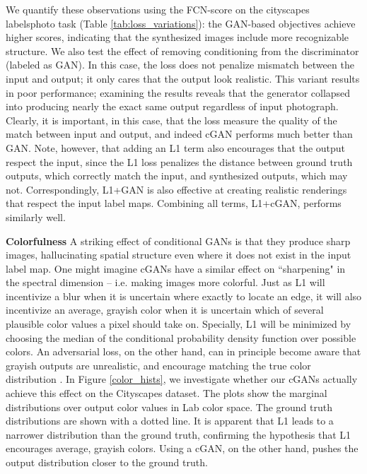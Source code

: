 \documentclass[10pt,twocolumn,letterpaper]{article}
\begin{document}
We quantify these observations using the FCN-score on the cityscapes labelsphoto task (Table \ref{tab:loss_variations}): the GAN-based objectives achieve higher scores, indicating that the synthesized images include more recognizable structure. We also test the effect of removing conditioning from the discriminator (labeled as GAN). In this case, the loss does not penalize mismatch between the input and output; it only cares that the output look realistic. This variant results in poor performance; examining the results reveals that the generator collapsed into producing nearly the exact same output regardless of input photograph. Clearly, it is important, in this case, that the loss measure the quality of the match between input and output, and indeed cGAN performs much better than GAN. Note, however, that adding an L1 term also encourages that the output respect the input, since the L1 loss penalizes the distance between ground truth outputs, which correctly match the input, and synthesized outputs, which may not. Correspondingly, L1+GAN is also effective at creating realistic renderings that respect the input label maps. Combining all terms, L1+cGAN, performs similarly well.



{\bf Colorfulness} A striking effect of conditional GANs is that they produce sharp images, hallucinating spatial structure even where it does not exist in the input label map. One might imagine cGANs have a similar effect on ``sharpening" in the spectral dimension -- i.e. making images more colorful. Just as L1 will incentivize a blur when it is uncertain where exactly to locate an edge, it will also incentivize an average, grayish color when it is uncertain which of several plausible color values a pixel should take on. Specially, L1 will be minimized by choosing the median of the conditional probability density function over possible colors. An adversarial loss, on the other hand, can in principle become aware that grayish outputs are unrealistic, and encourage matching the true color distribution \cite{goodfellow2014generative}. In Figure \ref{color_hists}, we investigate whether our cGANs actually achieve this effect on the Cityscapes dataset. The plots show the marginal distributions over output color values in Lab color space. The ground truth distributions are shown with a dotted line. It is apparent that L1 leads to a narrower distribution than the ground truth, confirming the hypothesis that L1 encourages average, grayish colors. Using a cGAN, on the other hand, pushes the output distribution closer to the ground truth.
\end{document}
